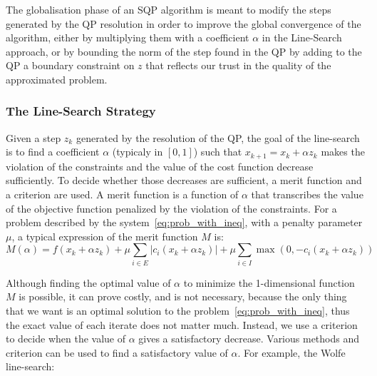 The globalisation phase of an SQP algorithm is meant to modify the steps generated by the QP resolution in order to improve the global convergence of the algorithm, either by multiplying them with a coefficient $\alpha$ in the Line-Search approach, or by bounding the norm of the step found in the QP by adding to the QP a boundary constraint on $z$ that reflects our trust in the quality of the approximated problem.

\subsubsection{The Line-Search Strategy}
\label{ssub:line_search}

Given a step $z_k$ generated by the resolution of the QP, the goal of the line-search is to find a coefficient $\alpha$ (typicaly in $[0,1]$) such that $x_{k+1}=x_k + \alpha z_k$ makes the violation of the constraints and the value of the cost function decrease sufficiently.
To decide whether those decreases are sufficient, a merit function and a criterion are used.
A merit function is a function of $\alpha$ that transcribes the value of the objective function penalized by the violation of the constraints.
For a problem described by the system~\ref{eq:prob_with_ineq}, with a penalty parameter $\mu$, a typical expression of the merit function $M$ is:
\begin{equation}
  M(\alpha) = f(x_k +\alpha z_k) + \mu \sum_{i\in E} \left| c_i(x_k+\alpha z_k) \right| + \mu \sum_{i\in I} \max \left(0,-c_i(x_k + \alpha z_k)\right)
\end{equation}

Although finding the optimal value of $\alpha$ to minimize the 1-dimensional function $M$ is possible, it can prove costly, and is not necessary, because the only thing that we want is an optimal solution to the problem~\ref{eq:prob_with_ineq}, thus the exact value of each iterate does not matter much.
Instead, we use a criterion to decide when the value of $\alpha$ gives a satisfactory decrease.
Various methods and criterion can be used to find a satisfactory value of $\alpha$.
For example, the Wolfe line-search:




